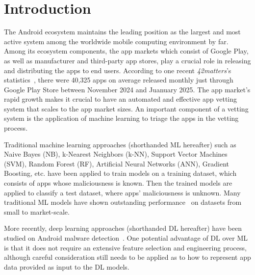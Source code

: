 \section{Introduction}
 The Android ecosystem maintains the leading position as the largest
 and most active system among the worldwide mobile computing
 environment by far. Among its ecosystem components, the app markets
 which consist of Google Play, as well as manufacturer and third-party app stores,
 play a crucial role in releasing and distributing the apps
 to end users. According to one recent {\it 42matters}'s statistics~\cite{42matters:googleplay2025}, there
 were 40,325 apps on average released monthly just through
 Google Play Store between November 2024 and Juanuary 2025.
 The app market’s rapid growth makes it crucial to have an automated and effective app vetting
 system that scales to the app market sizes.
 An important component of a vetting
 system is the application of machine learning to triage the
 apps in the vetting process.

 Traditional machine learning approaches (shorthanded ML hereafter) such as Naive Bayes (NB), k-Nearest
Neighbors (k-NN), Support Vector Machines (SVM), Random Forest (RF),
Artificial Neural Networks (ANN), Gradient Boosting, etc. have been
applied to train models on a training dataset, which consists of apps
whose maliciousness is known. Then the trained models are applied to
classify a test dataset, where apps' maliciousness is unknown.  Many
traditional ML models have shown outstanding
performance~\cite{Iker:SPSM11, Aafer:SecureComm13, Gascon:AISec13,
WiSec:Saurabh13, Arp:NDSS14, Yang:ESORICS14, Periravian:ICTAI13,
Chen:ASIACCS16, Yan:MobiSys19, Gong:EuroSys20} on datasets from small
to market-scale.

 More recently, deep learning approaches (shorthanded DL hereafter) have been studied on Android
 malware detection~\cite{Yuan:SIGCOMM14, Su:TrustCom16, Hou:WIW16,
   McLaughlin:CODASPY17, Karbab:DFRWS18, Xu:EuroS&P18, Xu:ICFEM18,
   Xiao:MTA19, Kim:TIFS18, Wang:JAIHC19, Oak:AISec19,
   Alzaylaee:Computer&security20, Nadia:MALHat21, Chen:USENIX23, Sun:esem24}. One potential advantage of DL over
   ML is that it does not require an extensive feature selection and engineering process, although careful consideration still
   needs to be applied as to how to represent app
   data provided as input to the DL models.
 
